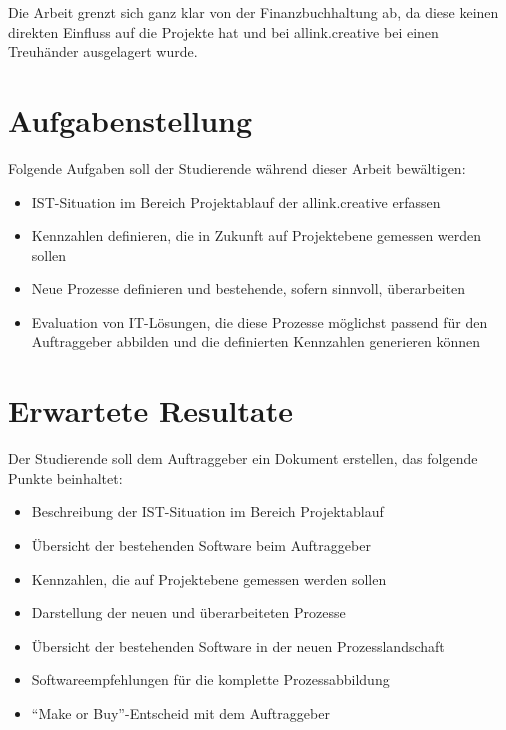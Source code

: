 \documentclass[]{scrreprt}
\begin{document}
    Die Arbeit grenzt sich ganz klar von der Finanzbuchhaltung ab, da
    diese keinen direkten Einfluss auf die Projekte hat und bei allink.creative 
    bei einen Treuhänder ausgelagert wurde.
    

    \section{Aufgabenstellung}
    Folgende Aufgaben soll der Studierende während dieser Arbeit bewältigen:
    
    \begin{itemize}
        \item IST-Situation im Bereich Projektablauf der allink.creative erfassen
        \item Kennzahlen definieren, die in Zukunft auf Projektebene gemessen 
            werden sollen
        \item Neue Prozesse definieren und bestehende, sofern sinnvoll, überarbeiten
        \item Evaluation von IT-Lösungen, die diese Prozesse möglichst passend 
            für den Auftraggeber abbilden und die definierten Kennzahlen generieren können
    \end{itemize}

    \section{Erwartete Resultate}
    Der Studierende soll dem Auftraggeber ein Dokument erstellen, das folgende 
    Punkte beinhaltet: 
    
    \begin{itemize}
        \item Beschreibung der IST-Situation im Bereich Projektablauf
        \item Übersicht der bestehenden Software beim Auftraggeber
        \item Kennzahlen, die auf Projektebene gemessen werden sollen
        \item Darstellung der neuen und überarbeiteten Prozesse
        \item Übersicht der bestehenden Software in der neuen Prozesslandschaft
        \item Softwareempfehlungen für die komplette Prozessabbildung
        \item ``Make or Buy''-Entscheid mit dem Auftraggeber
    \end{itemize}
    
\end{document}
